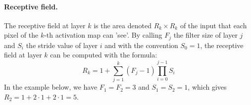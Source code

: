 
\paragraph{Receptive field.} The receptive field at layer $k$ is the area denoted $R_k \times R_k$ of the input that each pixel of the $k$-th activation map can 'see'. By calling $F_j$ the filter size of layer $j$ and $S_i$ the stride value of layer $i$ and with the convention $S_0=1$, the receptive field at layer $k$ can be computed with the formula:
\[
R_k=1+\sum_{j=1}^k\left(F_j-1\right) \prod_{i=0}^{j-1} S_i
\]
In the example below, we have $F_1=F_2=3$ and $S_1=S_2=1$, which gives $R_2=1+2 \cdot 1+2 \cdot 1=5$.

